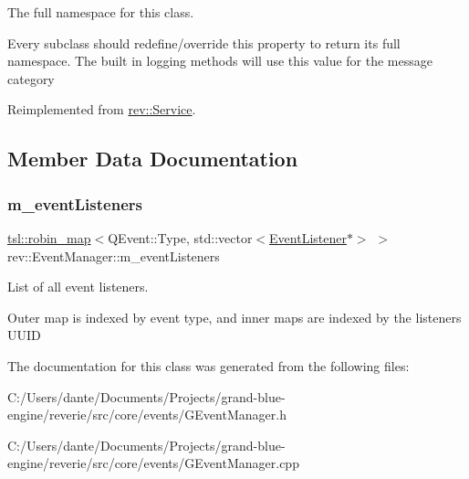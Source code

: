 The full namespace for this class. 

Every subclass should redefine/override this property to return its full namespace. The built in logging methods will use this value for the message category 

Reimplemented from \mbox{\hyperlink{classrev_1_1_service_a831f5bf8c53584ec830aaee38ea58e7b}{rev\+::\+Service}}.



\subsection{Member Data Documentation}
\mbox{\label{classrev_1_1_event_manager_a379251942134025a1c87bc801951fed5}} 
\subsubsection{\texorpdfstring{m\_eventListeners}{m\_eventListeners}}
{\footnotesize\ttfamily \mbox{\hyperlink{classtsl_1_1robin__map}{tsl\+::robin\+\_\+map}}$<$Q\+Event\+::\+Type, std\+::vector$<$\mbox{\hyperlink{classrev_1_1_event_listener}{Event\+Listener}}$\ast$$>$ $>$ rev\+::\+Event\+Manager\+::m\+\_\+event\+Listeners\hspace{0.3cm}{\ttfamily [protected]}}



List of all event listeners. 

Outer map is indexed by event type, and inner maps are indexed by the listener\textquotesingle{}s U\+U\+ID 

The documentation for this class was generated from the following files\+:\begin{DoxyCompactItemize}
\item 
C\+:/\+Users/dante/\+Documents/\+Projects/grand-\/blue-\/engine/reverie/src/core/events/G\+Event\+Manager.\+h\item 
C\+:/\+Users/dante/\+Documents/\+Projects/grand-\/blue-\/engine/reverie/src/core/events/G\+Event\+Manager.\+cpp\end{DoxyCompactItemize}
